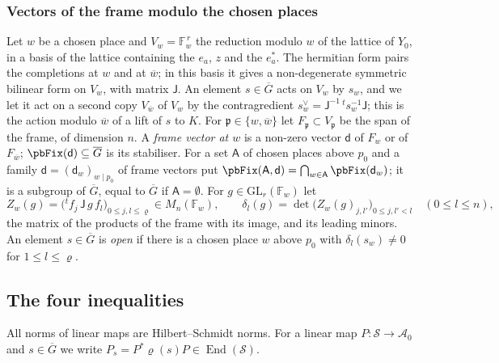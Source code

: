 \documentclass[10pt]{amsart}
\theoremstyle{definition}
\theoremstyle{remark}
\providecommand{\auAz}{\mathcal A_0}
\providecommand{\auF}{\mathbb F}
\providecommand{\auG}{\overline G}
\providecommand{\auGL}{\mathrm{GL}}
\providecommand{\auS}{\mathcal S}
\providecommand{\aubar}[1]{\overline{#1}}
\begin{document}
\subsubsection*{Vectors of the frame modulo the chosen places}
Let $w$ be a chosen place and $V_w=\auF_w^{\,r}$ the reduction modulo $w$ of the lattice of $Y_0$,
in a basis of the lattice containing the $e_a$, $z$ and the $e_a^*$. The hermitian form pairs the
completions at $w$ and at $\aubar w$; in this basis it gives a non-degenerate symmetric bilinear
form on $V_w$, with matrix $\mathsf J$. An element $s\in\auG$ acts on $V_w$ by $s_w$, and we let it
act on a second copy $V_{\aubar w}$ of $V_w$ by the contragredient $s_w^{\vee}=\mathsf J^{-1}\,
{}^ts_w^{-1}\mathsf J$; this is the action modulo $\aubar w$ of a lift of $s$ to $K$. For
$\mathfrak p\in\{w,\aubar w\}$ let $F_{\mathfrak p}\subset V_{\mathfrak p}$ be the span of the
frame, of dimension $n$. A \emph{frame vector at $w$} is a non-zero vector $\mathsf d$ of $F_w$ or
of $F_{\aubar w}$; $\pbFix(\mathsf d)\subseteq\auG$ is its stabiliser. For a set $\mathsf A$ of
chosen places above $p_0$ and a family $\mathsf d=(\mathsf d_w)_{w\mid p_0}$ of frame vectors put
$\pbFix(\mathsf A,\mathsf d)=\bigcap_{w\in\mathsf A}\pbFix(\mathsf d_w)$; it is a subgroup of
$\auG$, equal to $\auG$ if $\mathsf A=\emptyset$. For $g\in\auGL_r(\auF_w)$ let
\[
Z_w(g)=\bigl({}^tf_j\,\mathsf J\,g\,f_l\bigr)_{0\le j,l\le\varrho}\in M_n(\auF_w),\qquad
\delta_l(g)=\det\bigl(Z_w(g)_{j,l'}\bigr)_{0\le j,l'<l}\quad(0\le l\le n),
\]
the matrix of the products of the frame with its image, and its leading minors. An element
$s\in\auG$ is \emph{open} if there is a chosen place $w$ above $p_0$ with $\delta_l(s_w)\ne0$ for
$1\le l\le\varrho$.

\subsection{The four inequalities}\label{pb:ss-est}

All norms of linear maps are Hilbert--Schmidt norms. For a linear map $P\colon\auS\to\auAz$ and
$s\in\auG$ we write $P_s=P^*\varrho(s)P\in\operatorname{End}(\auS)$.
\end{document}
